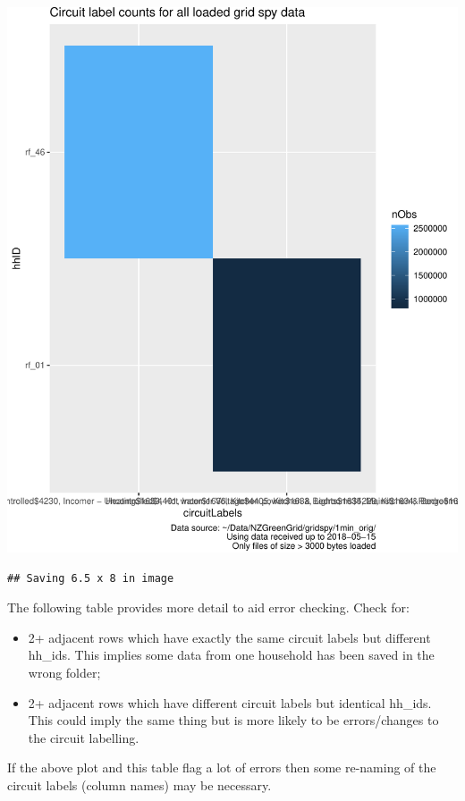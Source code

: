 \documentclass[]{article}
\providecommand{\tightlist}{%
  \setlength{\itemsep}{0pt}\setlength{\parskip}{0pt}}
\begin{document}
\includegraphics{processNZGGElecCons1minData_v2_files/figure-latex/plotCircuitLabelIssuesAsTile-1.pdf}

\begin{verbatim}
## Saving 6.5 x 8 in image
\end{verbatim}

The following table provides more detail to aid error checking. Check
for:

\begin{itemize}
\tightlist
\item
  2+ adjacent rows which have exactly the same circuit labels but
  different hh\_ids. This implies some data from one household has been
  saved in the wrong folder;
\item
  2+ adjacent rows which have different circuit labels but identical
  hh\_ids. This could imply the same thing but is more likely to be
  errors/changes to the circuit labelling.
\end{itemize}

If the above plot and this table flag a lot of errors then some
re-naming of the circuit labels (column names) may be necessary.
\end{document}
